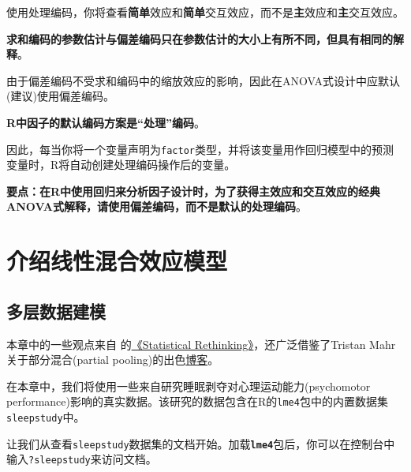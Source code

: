 \documentclass[
]{book}
\begin{document}
使用处理编码，你将查看\textbf{简单}效应和\textbf{简单}交互效应，而不是\textbf{主}效应和\textbf{主}交互效应。

\textbf{求和编码的参数估计与偏差编码只在参数估计的大小上有所不同，但具有相同的解释}。

由于偏差编码不受求和编码中的缩放效应的影响，因此在ANOVA式设计中应默认(建议)使用偏差编码。

\textbf{R中因子的默认编码方案是``处理''编码}。

因此，每当你将一个变量声明为\texttt{factor}类型，并将该变量用作回归模型中的预测变量时，R将自动创建处理编码操作后的变量。

\textbf{要点：在R中使用回归来分析因子设计时，为了获得主效应和交互效应的经典ANOVA式解释，请使用偏差编码，而不是默认的处理编码}。

\hypertarget{ux4ecbux7ecdux7ebfux6027ux6df7ux5408ux6548ux5e94ux6a21ux578b}{%
\chapter{介绍线性混合效应模型}\label{ux4ecbux7ecdux7ebfux6027ux6df7ux5408ux6548ux5e94ux6a21ux578b}}

\hypertarget{ux591aux5c42ux6570ux636eux5efaux6a21}{%
\section{多层数据建模}\label{ux591aux5c42ux6570ux636eux5efaux6a21}}

本章中的一些观点来自 \citet{McElreath_2020} 的\href{https://xcelab.net/rm/statistical-rethinking/}{《Statistical Rethinking》}，还广泛借鉴了Tristan Mahr关于部分混合(partial pooling)的出色\href{https://www.tjmahr.com/plotting-partial-pooling-in-mixed-effects-models/}{博客}。

在本章中，我们将使用一些来自研究睡眠剥夺对心理运动能力(psychomotor performance)影响的真实数据\citep{Belenky_et_al_2003}。该研究的数据包含在R的\texttt{lme4}包中的内置数据集\texttt{sleepstudy}中\citep{Bates_et_al_2015}。

让我们从查看\texttt{sleepstudy}数据集的文档开始。加载\textbf{\texttt{lme4}}包后，你可以在控制台中输入\texttt{?sleepstudy}来访问文档。
\end{document}
